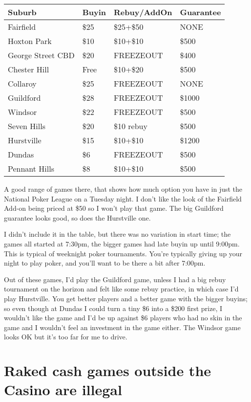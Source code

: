 \begin{tabular}{|l|l|l|l|} \hline
Suburb & Buyin & Rebuy/AddOn & Guarantee \\ \hline
Fairfield        & \$25 & \$25+\$50 & NONE \\ \hline
Hoxton Park       & \$10 & \$10+\$10 & \$500 \\ \hline
George Street CBD & \$20 & FREEZEOUT & \$400 \\ \hline
Chester Hill & Free & \$10+\$20 & \$500 \\ \hline
Collaroy & \$25 & FREEZEOUT & NONE \\ \hline
Guildford & \$28 & FREEZEOUT & \$1000 \\ \hline
Windsor & \$22 & FREEZEOUT & \$500 \\ \hline
Seven Hills & \$20 & \$10 rebuy & \$500 \\ \hline
Hurstville & \$15 & \$10+\$10 & \$1200 \\ \hline
Dundas & \$6 & FREEZEOUT & \$500 \\ \hline
Pennant Hills & \$8 & \$10+\$10 & \$500 \\ \hline
\end{tabular}

A good range of games there, that shows how much option you
have in just the National Poker League on a Tuesday night.
I don't like the look of the Fairfield Add-on being priced at \$50
so I won't play that game. The big Guildford guarantee looks
good, so does the Hurstville one.

I didn't include it in the table, but there was no variation in start
time; the games all started at 7:30pm, the bigger games had late buyin
up until 9:00pm. This is typical of weeknight poker
tournaments. You're typically giving up your night to play poker, and
you'll want to be there a bit after 7:00pm.

Out of these games, I'd play the Guildford game, unless I had a big
rebuy tournament on the horizon and felt like some rebuy practice, in
which case I'd play Hurstville. You get better players and a better
game with the bigger buyins; so even though at Dundas I could turn a
tiny \$6 into a \$200 first prize, I wouldn't like the game and I'd be
up against \$6 players who had no skin in the game
and I wouldn't feel an investment in the game either. The Windsor game
looks OK but it's too far for me to drive.

\section{Raked cash games outside the Casino are illegal}

